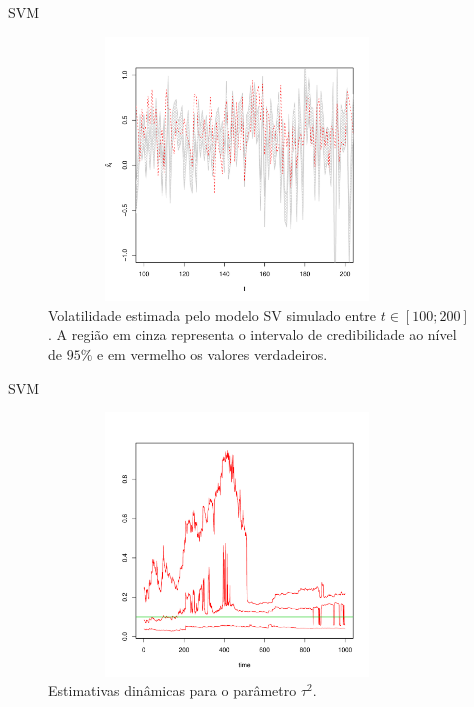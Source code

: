 \documentclass{beamer}
\begin{document}
\begin{frame}{SVM}


\begin{figure}
\begin{center}
 \includegraphics[height=7cm,width =10cm]{processo_1_01_02_05.pdf}
 \end{center}
\caption{Volatilidade estimada pelo modelo SV simulado entre $t \in [100 ;200]$. A região em cinza representa o intervalo de credibilidade ao nível de $95\%$ e em vermelho os valores verdadeiros.} 
\end{figure}

 \end{frame}
 
 
 \begin{frame}{SVM}

 
 \begin{figure}
\begin{center}
 \includegraphics[height=7cm,width =10cm]{tau_1_01_02_05.pdf}
 \end{center}
\caption{ Estimativas dinâmicas para o parâmetro $\tau^2$.} 
\end{figure}

 \end{frame}
 
\end{document}
